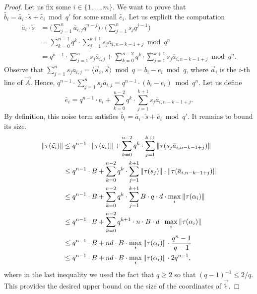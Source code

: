 \begin{proof}
Let us fix some $i \in \{1,\dots,m\}$. We want to prove that $\tilde{b_i} = \tilde{a_i} \cdot \tilde{s} + \tilde{e_i}\bmod q'$ for some small $\tilde{e_i}$. Let us explicit the computation
\begin{align*}
\tilde{a_i} \cdot \tilde{s} &= \Big(\sum_{j = 1}^n \overline{a}_{i,j} q^{n-j} \Big) \cdot \Big( \sum_{j=1}^n s_j q^{j-1}\Big) \\
&= \sum_{k = 0}^{n-1} q^k \cdot \sum_{j = 1}^{k+1} s_j \overline{a}_{i,n-k-1+j} \bmod q^n\\
&= q^{n-1} \cdot \sum_{j = 1}^n s_j \overline{a}_{i,j} + \sum_{k = 0}^{n-2} q^k \cdot \sum_{j = 1}^{k+1} s_j \overline{a}_{i,n-k-1+j} \bmod q^n.
\end{align*}
Observe that $\sum_{j = 1}^n s_j \overline{a}_{i,j} = \langle \vec a_i, \vec s \rangle \bmod q = b_i-e_i \bmod q$, where $\vec a_i$ is the $i$-th line of $\vec A$. Hence, $q^{n-1} \cdot \sum_{j = 1}^n s_j \overline{a}_{i,j} = q^{n-1} \cdot (b_i - e_i) \bmod q^n$.
Let us define 
\[ \tilde{e_i} = q^{n-1} \cdot e_i + \sum_{k = 0}^{n-2} q^k \cdot \sum_{j = 1}^{k+1} s_j \overline{a}_{i,n-k-1+j}.\]
By definition, this noise term satisfies $\tilde{b_i} = \tilde{a_i} \cdot \tilde{s} + \tilde{e_i}\bmod q'$. It remains to bound its size.
\begin{align*}
\|\tau(\tilde{e_i})\| & \leq q^{n-1} \cdot \|\tau(e_i)\| + \sum_{k = 0}^{n-2} q^k \cdot \sum_{j = 1}^{k+1} \|\tau(s_j \overline{a}_{i,n-k-1+j})\| \\
&\leq q^{n-1} \cdot B + \sum_{k = 0}^{n-2} q^k \cdot \sum_{j = 1}^{k+1} \|\tau(s_j)\| \cdot \|\tau(\overline{a}_{i,n-k-1+j})\| \\
&\leq q^{n-1} \cdot B + \sum_{k = 0}^{n-2} q^k \cdot \sum_{j = 1}^{k+1} B \cdot q \cdot d \cdot \max_i \|\tau(\alpha_i)\| \\
&\leq q^{n-1} \cdot B + \sum_{k = 0}^{n-2} q^{k+1} \cdot n \cdot B \cdot d \cdot \max_i \|\tau(\alpha_i)\| \\
&\leq q^{n-1} \cdot B + nd \cdot B \cdot \max_i \|\tau(\alpha_i)\| \cdot \frac{q^{n}-1}{q-1} \\
&\leq q^{n-1} \cdot B + nd \cdot B \cdot \max_i \|\tau(\alpha_i)\| \cdot 2q^{n-1},
\end{align*}
where in the last inequality we used the fact that $q \geq 2$ so that $(q-1)^{-1} \leq 2/q$. This provides the desired upper bound on the size of the coordinates of $\vec{\tilde{e}}$.
\end{proof}




